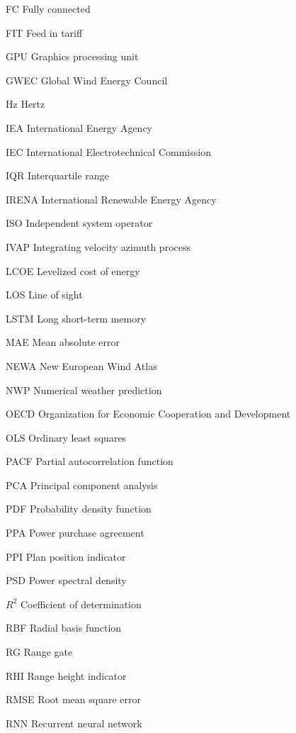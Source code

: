 \begin{abbreviations}
\item[FC] Fully connected 
\item[FIT] Feed in tariff 

\item[GPU] Graphics processing unit
\item[GWEC] Global Wind Energy Council

\item[Hz] Hertz

\item[IEA] International Energy Agency
\item[IEC] International Electrotechnical Commission
\item[IQR] Interquartile range
\item[IRENA] International Renewable Energy Agency
\item[ISO] Independent system operator
\item[IVAP] Integrating velocity azimuth process

\item[LCOE] Levelized cost of energy
\item[LOS] Line of sight
\item[LSTM] Long short-term memory

\item[MAE] Mean absolute error

\item[NEWA] New European Wind Atlas
\item[NWP] Numerical weather prediction

\item[OECD] Organization for Economic Cooperation and Development
\item[OLS] Ordinary least squares 

\item[PACF] Partial autocorrelation function
\item[PCA] Principal component analysis
\item[PDF] Probability density function
\item[PPA] Power purchase agreement
\item[PPI] Plan position indicator
\item[PSD] Power spectral density

\item[$R^2$] Coefficient of determination
\item[RBF] Radial basis function
\item[RG] Range gate
\item[RHI] Range height indicator
\item[RMSE] Root mean square error
\item[RNN] Recurrent neural network


\end{abbreviations}
